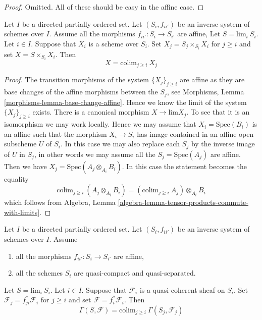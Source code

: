 \begin{proof}
Omitted. All of these should be easy in the affine case.
\end{proof}

\begin{lemma}
\label{lemma-scheme-over-limit}
Let $I$ be a directed partially ordered set.
Let $(S_i, f_{ii'})$ be an inverse system of schemes over $I$.
Assume all the morphisms $f_{ii'} : S_i \to S_{i'}$ are affine,
Let $S = \text{lim}_i\ S_i$. Let $i \in I$.
Suppose that $X_i$ is a scheme over $S_i$.
Set $X_j = S_j \times_{S_i} X_i$ for $j \geq i$ and set
$X = S \times_{S_i} X_i$.
Then
$$
X = \text{colim}_{j \geq i}\ X_j
$$
\end{lemma}

\begin{proof}
The transition morphisms of the system $\{X_j\}_{j \geq i}$ are
affine as they are base changes of the affine morphisms between
the $S_j$, see Morphisms, Lemma \ref{morphisms-lemma-base-change-affine}.
Hence we know the limit of the system $\{X_j\}_{j \geq i}$
exists. There is a canonical morphism $X \to \text{lim} X_j$.
To see that it is an isomorphism we may work locally.
Hence we may assume that $X_i = \text{Spec}(B_i)$ is an affine such that
the morphism $X_i \to S_i$ has image contained in an affine open
subscheme $U$ of $S_i$. In this case we may also replace each $S_j$
by the inverse image of $U$ in $S_j$, in other words we may assume
all the $S_j = \text{Spec}(A_j)$ are affine. Then we have
$X_j = \text{Spec}(A_j \otimes_{A_i} B_i)$. In this case the statement
becomes the equality
$$
\text{colim}_{j \geq i}\ (A_j \otimes_{A_i} B_i) =
(\text{colim}_{j \geq i}\ A_j) \otimes_{A_i} B_i
$$
which follows from
Algebra, Lemma \ref{algebra-lemma-tensor-products-commute-with-limits}.
\end{proof}


\begin{lemma}
\label{lemma-descend-section}
Let $I$ be a directed partially ordered set.
Let $(S_i, f_{ii'})$ be an inverse system of schemes over $I$.
Assume
\begin{enumerate}
\item all the morphisms $f_{ii'} : S_i \to S_{i'}$ are affine,
\item all the schemes $S_i$ are quasi-compact and quasi-separated.
\end{enumerate}
Let $S = \text{lim}_i\ S_i$. Let $i \in I$.
Suppose that $\mathcal{F}_i$ is a quasi-coherent sheaf on $S_i$.
Set $\mathcal{F}_j = f_{ji}^*\mathcal{F}_i$ for $j \geq i$ and set
$\mathcal{F} = f_i^*\mathcal{F}_i$.
Then
$$
\Gamma(S, \mathcal{F}) = \text{colim}_{j \geq i}\ \Gamma(S_j, \mathcal{F}_j)
$$
\end{lemma}

